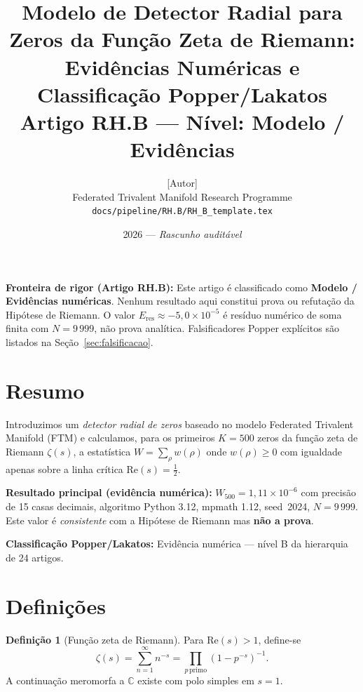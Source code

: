 \documentclass[12pt,a4paper]{article}
\title{%
  Modelo de Detector Radial para Zeros da Fun\c{c}\~ao Zeta de Riemann:\\
  Evid\^encias Num\'ericas e Classifica\c{c}\~ao Popper/Lakatos\\[4pt]
  {\large \textbf{Artigo RH.B} --- N\'ivel: Modelo / Evid\^encias}%
}
\author{%
  [Autor]\\
  {\small Federated Trivalent Manifold Research Programme}\\
  {\small \texttt{docs/pipeline/RH.B/RH\_B\_template.tex}}
}
\date{2026 --- \textit{Rascunho auditável}}
\theoremstyle{definition}
\newtheorem{definition}[theorem]{Defini\c{c}\~ao}
\begin{document}
\maketitle

\begin{mdframed}[backgroundcolor=gray!10, linewidth=2pt]
\textbf{Fronteira de rigor (Artigo RH.B):}
Este artigo é classificado como \textbf{Modelo / Evidências numéricas}.
Nenhum resultado aqui constitui prova ou refutação da Hipótese de Riemann.
O valor $E_{\mathrm{res}} \approx -5{,}0 \times 10^{-5}$ é resíduo numérico
de soma finita com $N = 9\,999$, não prova analítica.
Falsificadores Popper explícitos são listados na Seção~\ref{sec:falsificacao}.
\end{mdframed}

\tableofcontents
\newpage

\section{Resumo}

Introduzimos um \emph{detector radial de zeros} baseado no modelo
Federated Trivalent Manifold (FTM) e calculamos, para os primeiros
$K = 500$ zeros da função zeta de Riemann $\zeta(s)$, a estatística
$W = \sum_\rho w(\rho)$ onde $w(\rho) \ge 0$ com igualdade apenas
sobre a linha crítica $\mathrm{Re}(s) = \tfrac{1}{2}$.

\textbf{Resultado principal (evidência numérica):}
$W_{500} = 1{,}11 \times 10^{-6}$ com precisão de 15 casas decimais,
algoritmo Python 3.12, mpmath 1.12, seed~2024, $N = 9\,999$.
Este valor é \emph{consistente} com a Hipótese de Riemann mas
\textbf{não a prova}.

\textbf{Classificação Popper/Lakatos:} Evidência numérica
--- nível B da hierarquia de 24 artigos.

\section{Definições}\label{sec:definicoes}

\begin{definition}[Função zeta de Riemann]
Para $\mathrm{Re}(s) > 1$, define-se
\[
  \zeta(s) = \sum_{n=1}^{\infty} n^{-s}
           = \prod_{p\,\mathrm{primo}} (1 - p^{-s})^{-1}.
\]
A continuação meromorfa a $\mathbb{C}$ existe com polo simples em $s=1$.
\end{definition}
\end{document}
